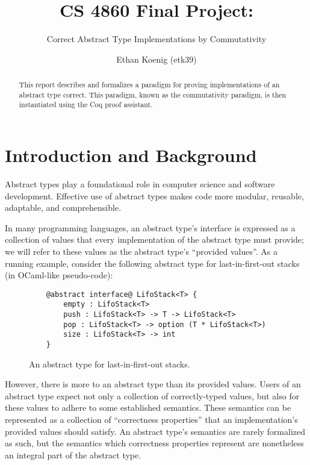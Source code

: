 \documentclass[12pt]{article}
\title{CS 4860 Final Project:}
\subtitle{Correct Abstract Type Implementations by Commutativity}
\author{Ethan Koenig (etk39)}
\begin{document}
\newcommand{\commutes}[2]{#1 \backsimeq #2}
\newcommand{\code}[1]{\lstinline{#1}}
\newcommand{\typinl}[2]{\lstinline{#1}:#2}


\maketitle{}

\begin{abstract}
This report describes and formalizes a paradigm for proving implementations of an abstract type correct. This paradigm, known as the commutativity paradigm, is then instantiated using the Coq proof assistant.
\end{abstract}

\section{Introduction and Background}

  Abstract types play a foundational role in computer science and software development. Effective use of abstract types makes code more modular, reusable, adaptable, and comprehensible.

  \bigskip

  \noindent In many programming languages, an abstract type's interface is expressed as a collection of values that every implementation of the abstract type must provide; we will refer to these values as the abstract type's ``provided values''. As a running example, consider the following abstract type for last-in-first-out stacks (in OCaml-like pseudo-code):

  \begin{figure}[H]
    \centering
    \begin{lstlisting}
    @abstract interface@ LifoStack<T> {
        empty : LifoStack<T>
        push : LifoStack<T> -> T -> LifoStack<T>
        pop : LifoStack<T> -> option (T * LifoStack<T>)
        size : LifoStack<T> -> int
    }
    \end{lstlisting}
    \caption{An abstract type for last-in-first-out stacks.}
  \end{figure}

  \noindent However, there is more to an abstract type than its provided values. Users of an abstract type expect not only a collection of correctly-typed values, but also for these values to adhere to some established semantics. These semantics can be represented as a collection of ``correctness properties'' that an implementation's provided values should satisfy. An abstract type's semantics are rarely formalized as such, but the semantics which correctness properties represent are nonetheless an integral part of the abstract type.
\end{document}

